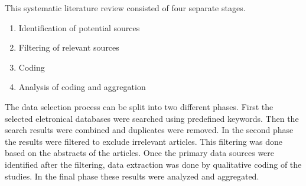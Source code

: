 This systematic literature review consisted of four separate stages.

\begin{enumerate}
	\item{Identification of potential sources}
	\item{Filtering of relevant sources}
	\item{Coding}
	\item{Analysis of coding and aggregation}
\end{enumerate}

The data selection process can be split into two different phases.
First the selected eletronical databases were searched using predefined
keywords. Then the search results were combined and duplicates were
removed. In the second phase the results were filtered to exclude
irrelevant articles. This filtering was done based on the abstracts
of the articles. Once the primary data sources were identified after
the filtering, data extraction was done by qualitative coding of the
studies. In the final phase these results were analyzed and aggregated.
